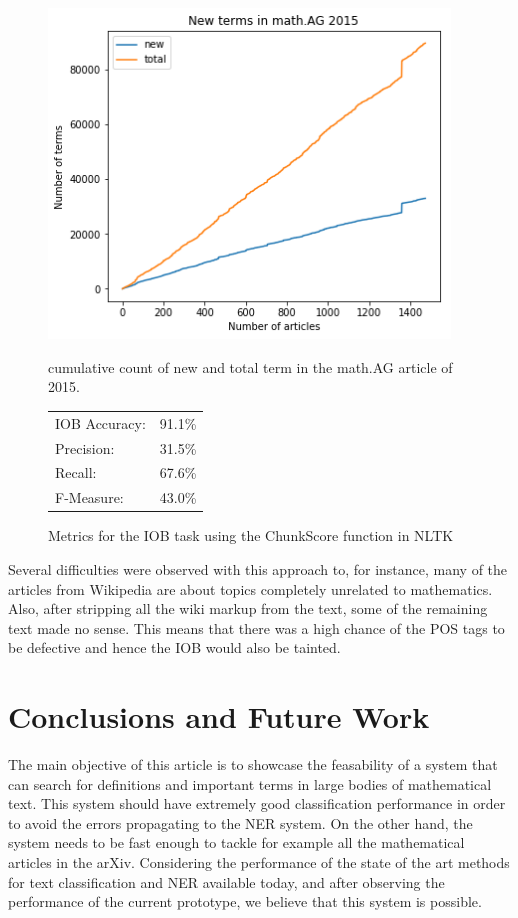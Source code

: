 \documentclass[a4paper]{easychair}
\begin{document}
\begin{figure}
    \centering
    \begin{minipage}{0.55\textwidth}
        \centering
    \includegraphics[width=0.95\textwidth]{cum_terms.png} 
        \caption{\label{cumterms}cumulative count of new and total term in the math.AG article of 2015.}
    \end{minipage}\hfill
    \begin{minipage}{0.4\textwidth}
        \centering
        {\small
        \begin{tabular}{lr}
    IOB Accuracy:  &91.1\%\\
    Precision:     &31.5\%\\
    Recall:        &67.6\%\\
    F-Measure:     &43.0\%
        \end{tabular}}
        \caption{\label{iobstats} Metrics for the IOB task using the ChunkScore function in NLTK}
    \end{minipage}
\end{figure}


Several difficulties were observed with this approach to, for instance, many of the articles from Wikipedia are about topics completely unrelated to mathematics. Also, after stripping all the wiki markup from the text, some of the remaining text made no sense. This means that there was a high chance of the POS tags to be defective and hence the IOB would also be tainted. 
 
\section{Conclusions and Future Work}
The main objective of this article is to showcase the feasability of a system that can search for definitions and important terms in large bodies of mathematical text. This system should have extremely good classification performance in order to avoid the errors propagating to the NER system. On the other hand, the system needs to be fast enough to tackle for example all the mathematical articles in the arXiv. Considering the performance of the state of the art methods for text classification and NER available today, and after observing the performance of the current prototype, we believe that this system is possible.
\end{document}
